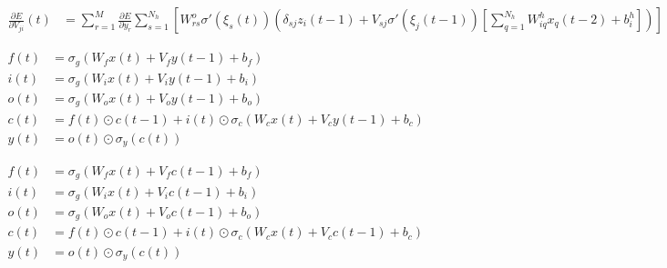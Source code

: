 \documentclass[multi={mymath},border=1pt]{standalone}
\newenvironment{mymath}{$\displaystyle}{$}
\begin{document}
\begin{mymath}
  \begin{aligned}
    \frac{\partial E}{\partial V_{ji}}(t) &= \sum_{r=1}^M \frac{\partial E}{\partial y_r} \sum_{s=1}^{N_h} \left[ W^o_{rs} \sigma'(\xi_s(t)) \left( \delta_{sj} z_i(t-1) + V_{sj} \sigma'(\xi_j(t-1)) \left[ \sum_{q=1}^{N_h} W^h_{iq} x_q(t-2) + b^h_i \right] \right) \right]
  \end{aligned}
\end{mymath}


\begin{mymath}
  \begin{aligned}
    f(t) &= \sigma_g ( W_f x(t) + V_f y(t-1) + b_f) \\
    i(t) &= \sigma_g (W_i x(t) + V_i y(t-1) + b_i) \\
    o(t) &= \sigma_g (W_o x(t) + V_o y(t-1) + b_o) \\
    c(t) &= f(t) \odot c(t-1) + i(t) \odot \sigma_c (W_c x(t) + V_c y(t-1) + b_c) \\
    y(t) &= o(t) \odot \sigma_y (c(t))
  \end{aligned}
\end{mymath}

\begin{mymath}
  \begin{aligned}
    f(t) &= \sigma_g ( W_f x(t) + V_f c(t-1) + b_f) \\
    i(t) &= \sigma_g (W_i x(t) + V_i c(t-1) + b_i) \\
    o(t) &= \sigma_g (W_o x(t) + V_o c(t-1) + b_o) \\
    c(t) &= f(t) \odot c(t-1) + i(t) \odot \sigma_c (W_c x(t) + V_c c(t-1) + b_c) \\
    y(t) &= o(t) \odot \sigma_y (c(t))
  \end{aligned}
\end{mymath}
\end{document}
